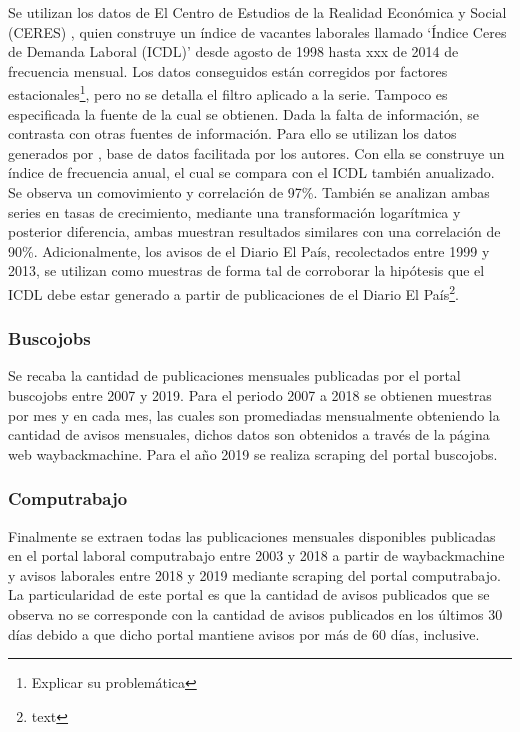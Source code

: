 \documentclass[msc,oneside,a4paper]{udelar} %
\begin{document}
  Se utilizan los datos de El Centro de Estudios de la Realidad Económica y Social (CERES) \cite{Ceres2012}, quien construye un índice de vacantes laborales llamado `Índice Ceres de Demanda Laboral (ICDL)' desde agosto de 1998 hasta xxx de 2014 de frecuencia mensual. Los datos conseguidos están corregidos por factores estacionales\footnote{Explicar su problemática}, pero no se detalla el filtro aplicado a la serie. Tampoco es especificada la fuente de la cual se obtienen.
  Dada la falta de información, se contrasta con otras fuentes de información. Para ello se utilizan los datos generados por \cite{Alma2011}, base de datos facilitada por los autores. Con ella se construye un índice de frecuencia anual, el cual se compara con el ICDL también anualizado. Se observa un comovimiento y correlación de 97\%. También se analizan ambas series en tasas de crecimiento, mediante una transformación logarítmica y posterior diferencia, ambas muestran resultados similares con una correlación de 90\%.
  Adicionalmente, los avisos de el Diario El País, recolectados entre 1999 y 2013, se utilizan como muestras de forma tal de corroborar la hipótesis que el ICDL debe estar generado a partir de publicaciones de el Diario El País\footnote{text}.
  
  \subsubsection*{Buscojobs}
  
  Se recaba la cantidad de publicaciones mensuales publicadas por el portal buscojobs entre 2007 y 2019. Para el periodo 2007 a 2018 se obtienen muestras por mes y en cada mes, las cuales son promediadas mensualmente obteniendo la cantidad de avisos mensuales, dichos datos son obtenidos a través de la página web waybackmachine.
  Para el año 2019 se realiza scraping del portal buscojobs.
  
  \subsubsection*{Computrabajo}
  
  Finalmente se extraen todas las publicaciones mensuales disponibles publicadas en el portal laboral computrabajo entre 2003 y 2018 a partir de waybackmachine y avisos laborales entre 2018 y 2019 mediante scraping del portal computrabajo. La particularidad de este portal es que la cantidad de avisos publicados que se observa no se corresponde con la cantidad de avisos publicados en los últimos 30 días debido a que dicho portal mantiene avisos por más de 60 días, inclusive.
  
\end{document}
